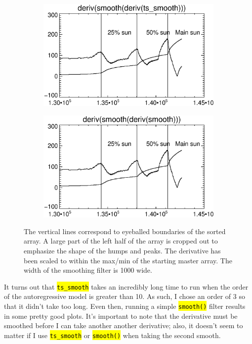 \documentclass[10pt]{scrartcl}
\begin{document}
\begin{figure}[!ht]
    \hspace{-1.0in}
    \begin{subfigure}[b]{.45\linewidth}
        \centering
        \includegraphics[width=1.3\textwidth]{../plots_tables_images/d_s_d_ts.eps}
    \end{subfigure}
    \hspace{.5in}
    \begin{subfigure}[b]{.45\linewidth}
        \centering
        \includegraphics[width=1.3\textwidth]{../plots_tables_images/d_s_d_reg.eps}
    \end{subfigure}
    \caption{The vertical lines correspond to eyeballed boundaries of the sorted array. A large part of the left half of the array is cropped out to emphasize the shape of the humps and peaks. The derivative has been scaled to within the max/min of the starting master array. The width of the smoothing filter is 1000 wide.}
    \label{comps}
\end{figure}

It turns out that \texttt{\hl{ts\_smooth}} takes an incredibly long time to run when the order of the autoregressive model is greater than 10. As such, I chose an order of 3 so that it didn't take too long. Even then, running a simple \hl{\texttt{smooth()}} filter results in some pretty good plots. It's important to note that the derivative must be smoothed before I can take another another derivative; also, it doesn't seem to matter if I use \texttt{\hl{ts\_smooth}} or \hl{\texttt{smooth()}} when taking the second smooth.
\end{document}
